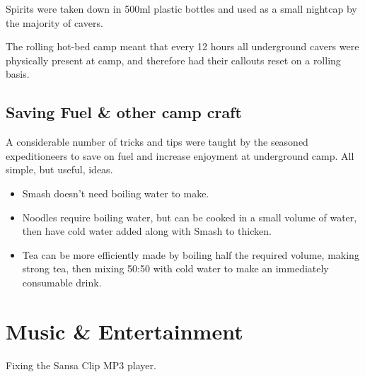 Spirits were taken down in 500ml plastic bottles and used as a small nightcap by the majority of cavers.

The rolling hot-bed camp meant that every 12 hours all underground cavers were physically present at camp, and therefore had their callouts reset on a rolling basis.


\subsection{Saving Fuel \& other camp
craft}

A considerable number of tricks and tips were taught by the seasoned expeditioneers to save on fuel and increase enjoyment at underground camp. All simple, but useful, ideas.

\begin{itemize}
\item
  Smash doesn't need boiling water to make.
\item
  Noodles require boiling water, but can be cooked in a small volume of
  water, then have cold water added along with Smash to thicken.
\item
  Tea can be more efficiently made by boiling half the required volume,
  making strong tea, then mixing 50:50 with cold water to make an
  immediately consumable drink.
\end{itemize}


\section{Music \& Entertainment}


\begin{marginfigure}
\checkoddpage \ifoddpage \forcerectofloat \else \forceversofloat \fi
\centering
 \caption{Fixing the Sansa Clip MP3 player. }
 \label{sansa fix}
\end{marginfigure}

